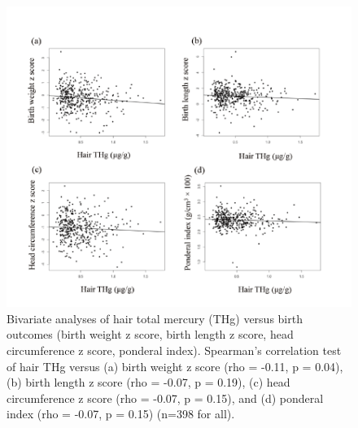 \begin{figure}
  \centering
    \label{fig:Fig313}
  \includegraphics[scale=1]{Figures/Fig313.pdf}
  \caption[Bivariate analyses of hair total mercury versus birth outcomes (birth weight z score, birth length z score, head circumference z score, ponderal index)]{Bivariate analyses of hair total mercury (THg) versus birth outcomes (birth weight z score, birth length z score, head circumference z score, ponderal index). Spearman's correlation test of hair THg versus (a) birth weight z score (rho = -0.11, p = 0.04), (b) birth length z score (rho = -0.07, p = 0.19), (c) head circumference z score (rho = -0.07, p = 0.15), and (d) ponderal index (rho = -0.07, p = 0.15) (n=398 for all).}
\end{figure}


